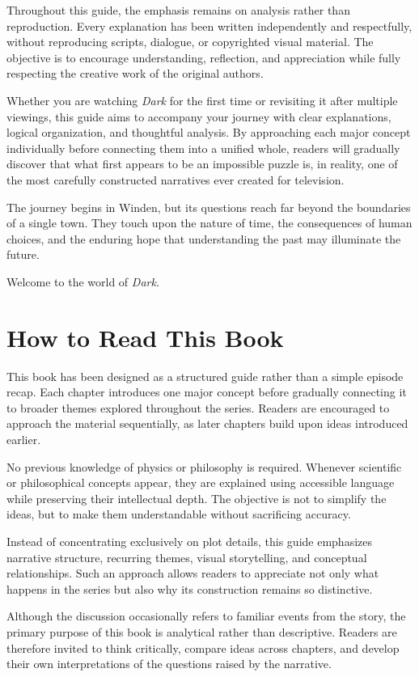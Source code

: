 \documentclass[12pt,oneside,openany]{book}
\begin{document}
Throughout this guide, the emphasis remains on analysis rather than reproduction. Every explanation has been written independently and respectfully, without reproducing scripts, dialogue, or copyrighted visual material. The objective is to encourage understanding, reflection, and appreciation while fully respecting the creative work of the original authors.

Whether you are watching \textit{Dark} for the first time or revisiting it after multiple viewings, this guide aims to accompany your journey with clear explanations, logical organization, and thoughtful analysis. By approaching each major concept individually before connecting them into a unified whole, readers will gradually discover that what first appears to be an impossible puzzle is, in reality, one of the most carefully constructed narratives ever created for television.

The journey begins in Winden, but its questions reach far beyond the boundaries of a single town. They touch upon the nature of time, the consequences of human choices, and the enduring hope that understanding the past may illuminate the future.

Welcome to the world of \textit{Dark}.
\section{How to Read This Book}

This book has been designed as a structured guide rather than a simple episode recap. Each chapter introduces one major concept before gradually connecting it to broader themes explored throughout the series. Readers are encouraged to approach the material sequentially, as later chapters build upon ideas introduced earlier.

No previous knowledge of physics or philosophy is required. Whenever scientific or philosophical concepts appear, they are explained using accessible language while preserving their intellectual depth. The objective is not to simplify the ideas, but to make them understandable without sacrificing accuracy.

Instead of concentrating exclusively on plot details, this guide emphasizes narrative structure, recurring themes, visual storytelling, and conceptual relationships. Such an approach allows readers to appreciate not only what happens in the series but also why its construction remains so distinctive.

Although the discussion occasionally refers to familiar events from the story, the primary purpose of this book is analytical rather than descriptive. Readers are therefore invited to think critically, compare ideas across chapters, and develop their own interpretations of the questions raised by the narrative.
\end{document}
